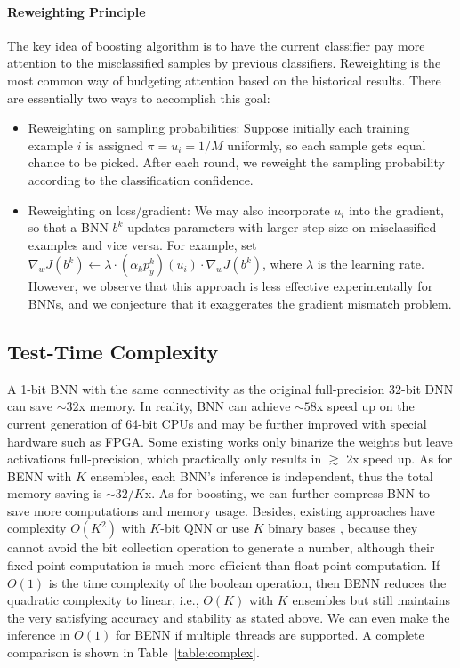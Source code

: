 \documentclass[10pt,twocolumn,letterpaper]{article}
\begin{document}
\paragraph{Reweighting Principle}
The key idea of boosting algorithm is to have the current classifier pay more attention to the misclassified samples by previous classifiers. Reweighting is the most common way of budgeting attention based on the historical results. There are essentially two ways to accomplish this goal:
\begin{itemize}[leftmargin=0.5cm]
    \item Reweighting on sampling probabilities: Suppose initially each training example $i$ is assigned $\pi = u_{i} = 1/M$ uniformly, so each sample gets equal chance to be picked. After each round, we reweight the sampling probability according to the classification confidence.
    \item Reweighting on loss/gradient: We may also incorporate $u_{i}$ into the gradient, so that a BNN $b^{k}$ updates parameters with larger step size on misclassified examples and vice versa. For example, set $\nabla_{w}J(b^{k}) \leftarrow \lambda \cdot  (\alpha_{k}p^{k}_{y})(u_{i}) \cdot \nabla_{w}J(b^{k})$, where $\lambda$ is the learning rate. However, we observe that this approach is less effective experimentally for BNNs, and we conjecture that it exaggerates the gradient mismatch problem.
\end{itemize}



\subsection{Test-Time Complexity}

A 1-bit BNN with the same connectivity as the original full-precision 32-bit DNN can save $\sim 32$x memory. In reality, BNN can achieve $\sim 58$x speed up on the current generation of 64-bit CPUs \cite{rastegari2016xnor} and may be further improved with special hardware such as FPGA. Some existing works only binarize the weights but leave activations full-precision, which practically only results in $\gtrsim$ 2x speed up. As for BENN with $K$ ensembles, each BNN's inference is independent, thus the total memory saving is $\sim 32/K$x. As for boosting, we can further compress BNN to save more computations and memory usage. Besides, existing approaches have complexity $O(K^{2})$ with $K$-bit QNN \cite{zhou2016dorefa} or use $K$ binary bases \cite{lin2017towards}, because they cannot avoid the bit collection operation to generate a number, although their fixed-point computation is much more efficient than float-point computation. If $O(1)$ is the time complexity of the boolean operation, then BENN reduces the quadratic complexity to linear, i.e., $O(K)$ with $K$ ensembles but still maintains the very satisfying accuracy and stability as stated above. We can even make the inference in $O(1)$ for BENN if multiple threads are supported. A complete comparison is shown in Table~\ref{table:complex}.
\end{document}
